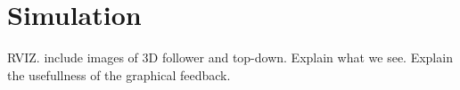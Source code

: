 
\section{Simulation} %
\label{sec:simulation}

RVIZ.
include images of 3D follower and top-down.
Explain what we see.
Explain the usefullness of the graphical feedback.


